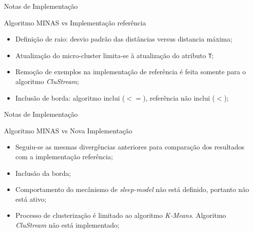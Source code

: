\documentclass[aspectratio=43,10pt]{beamer}
\begin{document}
\begin{frame}[fragile]{Notas de Implementação}
  \begin{alertblock}{Algoritmo MINAS vs Implementação referência}
    \begin{itemize}%
      \item Definição de raio: desvio padrão das distâncias versus distancia máxima;
      \item Atualização do micro-cluster limita-se à atualização do atributo \texttt{T};
      \item Remoção de exemplos na implementação de referência é feita somente para o algoritmo \textit{CluStream};
      \item Inclusão de borda: algoritmo inclui ($<=$), referência não inclui ($<$);
    \end{itemize}
  \end{alertblock}
\end{frame}
\begin{frame}[fragile]{Notas de Implementação}
  \begin{alertblock}{Algoritmo MINAS vs Nova Implementação}
    \begin{itemize}
      \item Seguiu-se as mesmas divergências anteriores para comparação dos resultados com a implementação referência;
      \item Inclusão da borda;
      \item Comportamento do mecânismo de \textit{sleep-model} não está definido, portanto não está ativo;
      \item Processo de clusterização é limitado ao algoritmo \textit{K-Means}. Algoritmo \textit{CluStream} não está implementado;
    \end{itemize}
  \end{alertblock}
\end{frame}
\end{document}

